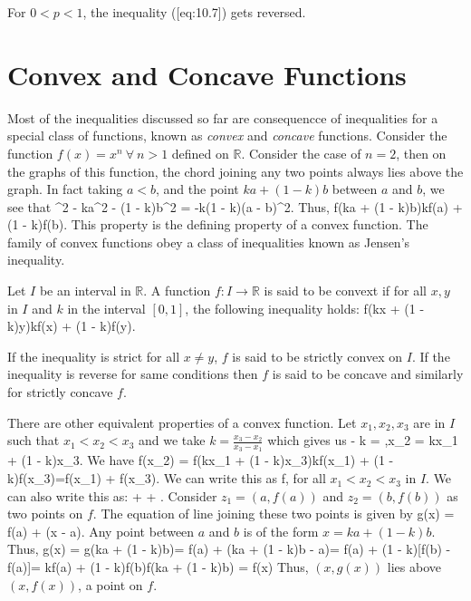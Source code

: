 \startremark
\stopremark For $0<p<1$, the inequality ([eq:10.7]) gets reversed.

\section{Convex and Concave Functions}
Most of the inequalities discussed so far are consequencce of inequalities for a special class of functions, known as
{\it convex} and {\it concave} functions. Consider the function $f(x) = x^n~\forall~n>1$ defined on $\mathbb{R}$. Consider
the case of $n=2$, then on the graphs of this function, the chord joining any two points always lies above the graph. In fact
taking $a<b$, and the point $ka + (1 - k)b$ between $a$ and $b$, we see that
\startformula [ka + (1 - k)b]^2 - ka^2 - (1 - k)b^2 = -k(1 - k)(a - b)^2.\stopformula
Thus,
\startformula f(ka + (1 - k)b)\leq kf(a) + (1 - k)f(b).\stopformula
This property is the defining property of a convex function. The family of convex functions obey a class of inequalities known as
Jensen's inequality.

Let $I$ be an interval in $\mathbb{R}$. A function $f:I\rightarrow\mathbb{R}$ is said to be convext if for all $x, y$ in $I$ and
$k$ in the interval $[0, 1]$, the following inequality holds:
\placeformula[eq:convex]\startformula
  f(kx + (1 - k)y)\leq kf(x) + (1 - k)f(y).
\stopformula

If the inequality is strict for all $x\neq y$, $f$ is said to be strictly convex on $I$. If the inequality is reverse for same
conditions then $f$ is said to be concave and similarly for strictly concave $f$.

There are other equivalent properties of a convex function. Let $x_1, x_2, x_3$ are in $I$ such that $x_1<x_2<x_3$ and we take $k =
\frac{x_3 - x_2}{x_3 - x_1}$ which gives us
 - k = ,x_2 = kx_1 + (1 - k)x_3.\stopformula
We have \startformula \startalign\NC f(x_2) \NC= f(kx_1 + (1 - k)x_3)\NR\NC\NC\leq kf(x_1) + (1 - k)f(x_3)\NR\NC\NC=f(x_1) +
  f(x_3).\stopalign\stopformula
We can write this as \startformula f\leq{},\stopformula
for all $x_1<x_2<x_3$ in $I$. We can also write this as:
\startformula {} +  + .\stopformula
Consider $z_1 = (a, f(a))$ and $z_2 = (b, f(b))$ as two points on $f$. The equation of line joining these two points is given by
\startformula g(x) = f(a) + (x - a).\stopformula
Any point between $a$ and $b$ is of the form $x = ka + (1 - k)b$. Thus,
\startformula \startalign\NC g(x) \NC = g(ka + (1 - k)b)\NR\NC\NC = f(a) + (ka + (1 - k)b - a)\NR\NC\NC = f(a) + (1 - k)[f(b) -
    f(a)]\NR\NC\NC = kf(a) + (1 - k)f(b)\NR\NC\NC \geq f(ka + (1 - k)b) = f(x)\stopalign\stopformula
Thus, $(x, g(x))$ lies above $(x, f(x))$, a point on $f$.

